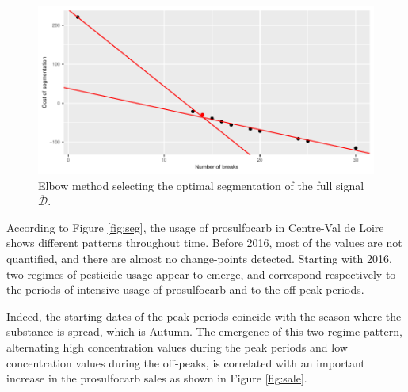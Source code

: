\begin{figure}[htbp]
  \centering
  \includegraphics[]{figs/Chap5/Elbow_seg-1.pdf}
  \caption{Elbow method selecting the optimal segmentation of the full signal $\overline{\mathcal{D}}$.}
  \label{fig:elb_seg}
\end{figure} 

According to Figure \ref{fig:seg}, the usage of prosulfocarb in Centre-Val de Loire shows different patterns throughout time. Before 2016, most of the values are not quantified, and there are almost no change-points detected. Starting with 2016, two regimes of pesticide usage appear to emerge, and correspond respectively to the periods of intensive usage of prosulfocarb and to the off-peak periods. 

Indeed, the starting dates of the peak periods coincide with the season where the substance is spread, which is Autumn. The emergence of this two-regime pattern, alternating high concentration values during the peak periods and low concentration values during the off-peaks, is correlated with an important increase in the prosulfocarb sales as shown in Figure \ref{fig:sale}. 

